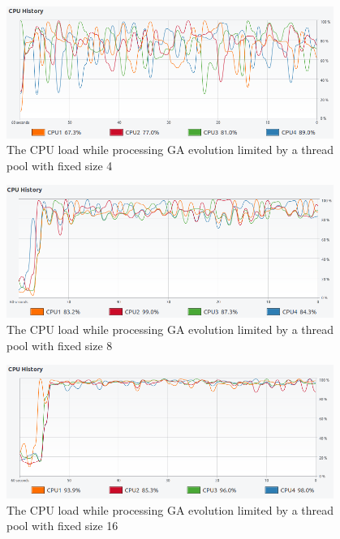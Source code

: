\begin{figure}[H]
\centering\includegraphics[width=0.95\textwidth]{img/exp/2/limit-threadpool-4}
\caption{The CPU load while processing GA evolution limited by a thread pool with fixed size 4 }  \label{img:cpu-thread-4}
\end{figure}

\begin{figure}[H]
\centering\includegraphics[width=0.95\textwidth]{img/exp/2/limit-threadpool-8}
\caption{The CPU load while processing GA evolution limited by a thread pool with fixed size 8 }  \label{img:cpu-thread-8}
\end{figure}

\begin{figure}[H]
\centering\includegraphics[width=0.95\textwidth]{img/exp/2/limit-threadpool-16}
\caption{The CPU load while processing GA evolution limited by a thread pool with fixed size 16 }  \label{img:cpu-thread-16}
\end{figure}

